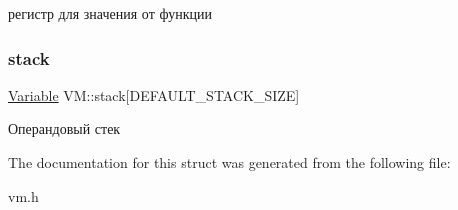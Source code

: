 регистр для значения от функции \mbox{\label{struct_v_m_a3a031323e2030d712c26dd8f0c79f637}} 
\subsubsection{\texorpdfstring{stack}{stack}}
{\footnotesize\ttfamily \hyperlink{union_variable}{Variable} V\+M\+::stack\mbox{[}D\+E\+F\+A\+U\+L\+T\+\_\+\+S\+T\+A\+C\+K\+\_\+\+S\+I\+ZE\mbox{]}}

Операндовый стек 

The documentation for this struct was generated from the following file\+:\begin{DoxyCompactItemize}
\item 
vm.\+h\end{DoxyCompactItemize}
